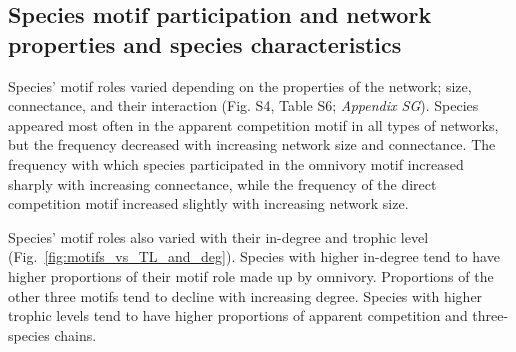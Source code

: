 \documentclass[12pt]{article}
\begin{document}
\begin{spacing}{2.0}
    
    \clearpage
    
    \subsection*{Species motif participation and network properties and species characteristics}

       Species' motif roles varied depending on the properties of the network; size, connectance, and their interaction (Fig. S4, Table S6; \emph{Appendix SG}).
        Species appeared most often in the apparent competition motif in all types of networks, but the frequency decreased with increasing network size and connectance.
        The frequency with which species participated in the omnivory motif increased sharply with increasing connectance, while the frequency of the direct competition motif increased slightly with increasing network size. 
        
        Species' motif roles also varied with their in-degree and trophic level (Fig.~\ref{fig:motifs_vs_TL_and_deg}).
        Species with higher in-degree tend to have higher proportions of their motif role made up by omnivory. Proportions of the other three motifs tend to decline with increasing degree.
        Species with higher trophic levels tend to have higher proportions of apparent competition and three-species chains. 
        


\end{spacing}
\end{document}
